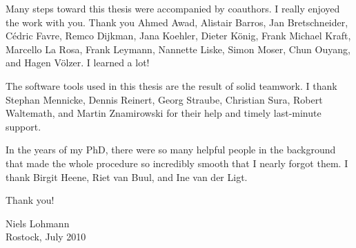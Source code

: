 Many steps toward this thesis were accompanied by coauthors. I really enjoyed the work with you. Thank you Ahmed Awad, Alistair Barros, Jan Bretschneider, C{\'e}dric Favre, Remco Dijkman, Jana Koehler, Dieter K\"onig, Frank Michael Kraft, Marcello La Rosa, Frank Leymann, Nannette Liske, Simon Moser, Chun Ouyang, and Hagen V\"olzer. I learned a lot!

The software tools used in this thesis are the result of solid teamwork. I thank Stephan Mennicke, Dennis Reinert, Georg Straube, Christian Sura, Robert Waltemath, and Martin Znamirowski for their help and timely last-minute support.

In the years of my PhD, there were so many helpful people in the background that made the whole procedure so incredibly smooth that I nearly forgot them. I thank Birgit Heene, Riet van Buul, and Ine van der Ligt.

\vspace{3em}

\noindent Thank you!

\bigskip

\noindent Niels Lohmann\\
Rostock, July 2010
